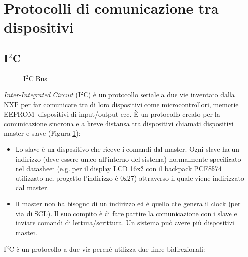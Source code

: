 \documentclass[12pt]{report}
\begin{document}
\section{Protocolli di comunicazione tra dispositivi}
%

%
\subsection{I$^2$C}\label{sec:i2c}
%

\begin{figure}[H]
	\caption{I$^2$C Bus}
	\label{fig:i2c_bus}
\end{figure}

\emph{Inter-Integrated Circuit} (I$^2$C) è un protocollo seriale a due vie inventato dalla NXP per far comunicare tra di loro dispositivi come microcontrollori, memorie EEPROM, dispositivi di input/output ecc. È un protocollo creato per la comunicazione sincrona e a breve distanza tra dispositivi chiamati dispositivi master e slave (Figura \ref{fig:i2c_bus}): 

\begin{itemize}
	\item Lo slave è un dispositivo che riceve i comandi dal master. Ogni slave ha un indirizzo (deve essere unico all'interno del sistema) normalmente specificato nel datasheet (e.g$.$ per il display LCD 16x2 con il backpack PCF8574 utilizzato nel progetto l'indirizzo è 0x27) attraverso il quale viene indirizzato dal master.
	\item Il master non ha bisogno di un indirizzo ed è quello che genera il clock (per via di SCL). Il suo compito è di fare partire la comunicazione con i slave e inviare comandi di lettura/scrittura. Un sistema può avere più dispositivi master.
\end{itemize}
I$^2$C è un protocollo a due vie perchè utilizza due linee bidirezionali:
\end{document}
